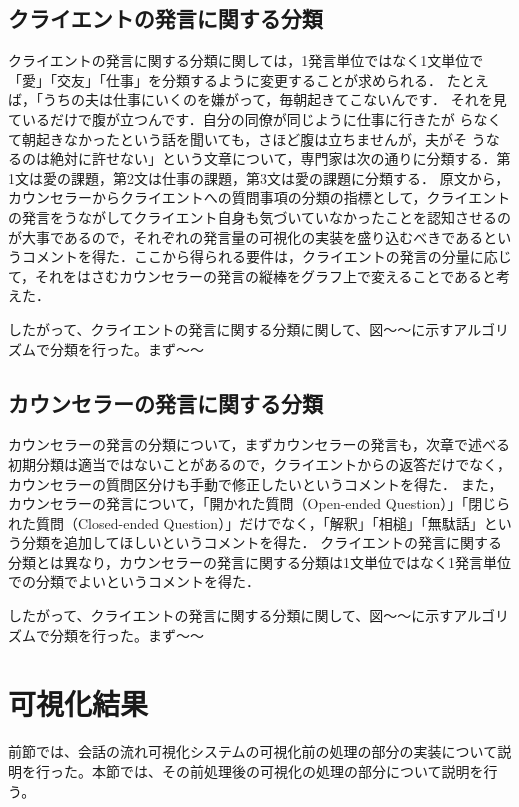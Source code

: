 \documentclass[shuuron]{kuee}
\begin{document}
\subsection{クライエントの発言に関する分類}



クライエントの発言に関する分類に関しては，1発言単位ではなく1文単位で「愛」「交友」「仕事」を分類するように変更することが求められる．
たとえば，「うちの夫は仕事にいくのを嫌がって，毎朝起きてこないんです．
それを見ているだけで腹が立つんです．自分の同僚が同じように仕事に行きたが
らなくて朝起きなかったという話を聞いても，さほど腹は立ちませんが，夫がそ
うなるのは絶対に許せない」という文章について，専門家は次の通りに分類する．第1文は愛の課題，第2文は仕事の課題，第3文は愛の課題に分類する．
原文から，カウンセラーからクライエントへの質問事項の分類の指標として，クライエントの発言をうながしてクライエント自身も気づいていなかったことを認知させるのが大事であるので，それぞれの発言量の可視化の実装を盛り込むべきであるというコメントを得た．ここから得られる要件は，クライエントの発言の分量に応じて，それをはさむカウンセラーの発言の縦棒をグラフ上で変えることであると考えた．

したがって、クライエントの発言に関する分類に関して、図〜〜に示すアルゴリズムで分類を行った。まず〜〜

\subsection{カウンセラーの発言に関する分類}

カウンセラーの発言の分類について，まずカウンセラーの発言も，次章で述べる初期分類は適当ではないことがあるので，クライエントからの返答だけでなく，カウンセラーの質問区分けも手動で修正したいというコメントを得た．
また，カウンセラーの発言について，「開かれた質問（Open-ended Question）」「閉じられた質問（Closed-ended Question）」だけでなく，「解釈」「相槌」「無駄話」という分類を追加してほしいというコメントを得た．
クライエントの発言に関する分類とは異なり，カウンセラーの発言に関する分類は1文単位ではなく1発言単位での分類でよいというコメントを得た．

したがって、クライエントの発言に関する分類に関して、図〜〜に示すアルゴリズムで分類を行った。まず〜〜


\section{可視化結果}

前節では、会話の流れ可視化システムの可視化前の処理の部分の実装について説明を行った。本節では、その前処理後の可視化の処理の部分について説明を行う。
\end{document}
